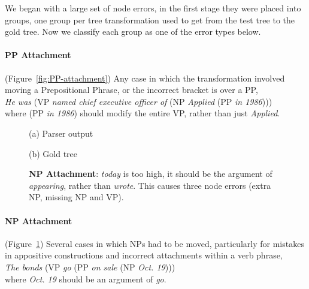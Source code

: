 We began with a large set of node errors, in the first stage they were placed into groups, one group per tree transformation used to get from the test tree to the gold tree.
Now we classify each group as one of the error types below.

\paragraph{PP Attachment} (Figure~\ref{fig:PP-attachment}) 
Any case in which the transformation involved moving a Prepositional Phrase, or the incorrect bracket is over a PP, \myeg \\ 
\emph{He was} (VP \emph{named chief executive officer of} (NP \emph{Applied} (PP \emph{in 1986}))) \\
where (PP \emph{in 1986}) should modify the entire VP, rather than just \emph{Applied}.

\begin{figure}
\begin{center}

\vspace{3mm}
(a) Parser output

\vspace{3mm}


(b) Gold tree
\end{center}
\derivspace
\caption[Error analysis example: NP Attachment.]{ \label{fig:NP-attachment} 
	\textbf{NP Attachment}: \emph{today} is too high, it should be the argument
	of \emph{appearing}, rather than \emph{wrote}.  This causes three node errors
	(extra NP, missing NP and VP).
}
\derivaftercompress
\end{figure}

\paragraph{NP Attachment} (Figure~\ref{fig:NP-attachment})  Several cases in which NPs had to be moved, particularly for mistakes in appositive constructions and incorrect attachments within a verb phrase, \myeg \\
\emph{The bonds} (VP \emph{go} (PP \emph{on sale} (NP \emph{Oct.\@\xspace 19}))) \\
where \emph{Oct.\@\xspace 19} should be an argument of \emph{go}.

